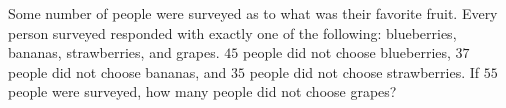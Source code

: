 Some number of people were surveyed as to what was their favorite fruit. Every person surveyed responded with exactly one of the following: blueberries, bananas, strawberries, and grapes. $45$ people did not choose blueberries, $37$ people did not choose bananas, and $35$ people did not choose strawberries. If $55$ people were surveyed, how many people did not choose grapes?
